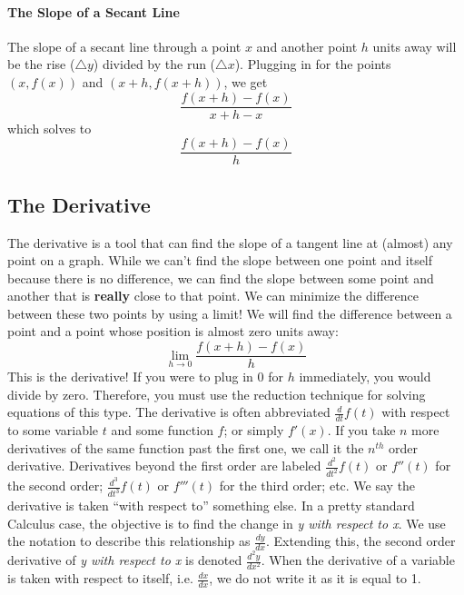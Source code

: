 \documentclass[../revisedmain.tex]{subfiles}
\begin{document}
	\paragraph{The Slope of a Secant Line} The slope of a secant line through a point $x$ and another point $h$ units away will be the rise ($\triangle y$) divided by the run ($\triangle x$). Plugging in for the points $(x,f(x))$ and $(x+h,f(x+h))$, we get $$\frac{f(x+h)-f(x)}{x+h-x}$$which solves to$$\frac{f(x+h)-f(x)}{h}$$
	\subsection{The Derivative}
	\par The derivative is a tool that can find the slope of a tangent line at (almost) any point on a graph. While we can't find the slope between one point and itself because there is no difference, we can find the slope between some point and another that is \textbf{really} close to that point. We can minimize the difference between these two points by using a limit! We will find the difference between a point and a point whose position is almost zero units away: $$\lim_{h\to 0} \frac{f(x+h)-f(x)}{h}$$ This is the derivative! If you were to plug in 0 for $h$ immediately, you would divide by zero. Therefore, you must use the reduction technique for solving equations of this type. The derivative is often abbreviated $\displaystyle\frac{d}{dt} f(t)$ with respect to some variable $t$ and some function $f$; or simply $f'(x)$. If you take $n$ more derivatives of the same function past the first one, we call it the $n^{th}$ order derivative. Derivatives beyond the first order are labeled $\displaystyle\frac{d^2}{dt^2} f(t)$ or $f''(t)$ for the second order; $\displaystyle\frac{d^3}{dt^3} f(t)$ or $f'''(t)$ for the third order; etc. We say the derivative is taken ``with respect to'' something else. In a pretty standard Calculus case, the objective is to find the change in  \textit{y with respect to x}. We use the notation to describe this relationship as $\displaystyle\frac{dy}{dx}$. Extending this, the second order derivative of \textit{y with respect to x} is denoted $\displaystyle\frac{d^2y}{dx^2}$. When the derivative of a variable is taken with respect to itself, i.e. $\displaystyle\frac{dx}{dx}$, we do not write it as it is equal to 1.\\
	\newline
\end{document}
